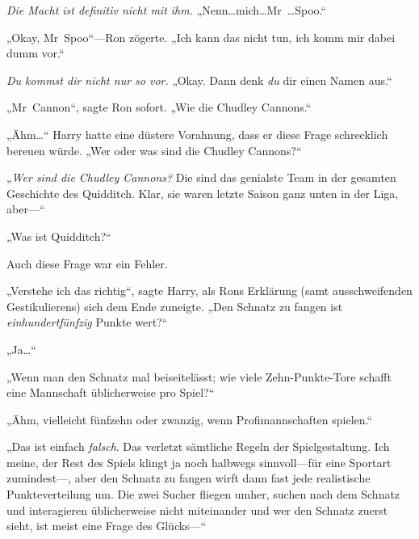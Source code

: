 \emph{Die Macht ist definitiv nicht mit ihm.} „Nenn…mich…Mr~…Spoo.“

„Okay, Mr~Spoo“—Ron zögerte. „Ich kann das nicht tun, ich komm mir dabei dumm vor.“

\emph{Du kommst dir nicht nur so vor.} „Okay. Dann denk \emph{du} dir einen Namen aus.“

„Mr~Cannon“, sagte Ron sofort. „Wie die Chudley Cannons.“

„Ähm…“ Harry hatte eine düstere Vorahnung, dass er diese Frage schrecklich bereuen würde. „Wer oder was sind die Chudley Cannons?“

„\emph{Wer sind die Chudley Cannons?} Die sind das genialste Team in der gesamten Geschichte des Quidditch. Klar, sie waren letzte Saison ganz unten in der Liga, aber—“

„Was ist Quidditch?“

Auch diese Frage war ein Fehler.

„Verstehe ich das richtig“, sagte Harry, als Rons Erklärung (samt ausschweifenden Gestikulierens) sich dem Ende zuneigte. „Den Schnatz zu fangen ist \emph{einhundertfünfzig} Punkte wert?“

„Ja…“

„Wenn man den Schnatz mal beiseitelässt; wie viele Zehn-Punkte-Tore schafft eine Mannschaft üblicherweise pro Spiel?“

„Ähm, vielleicht fünfzehn oder zwanzig, wenn Profimannschaften spielen.“

„Das ist einfach \emph{falsch}. Das verletzt sämtliche Regeln der Spielgestaltung. Ich meine, der Rest des Spiels klingt ja noch halbwegs sinnvoll—für eine Sportart zumindest—, aber den Schnatz zu fangen wirft dann fast jede realistische Punkteverteilung um. Die zwei Sucher fliegen umher, suchen nach dem Schnatz und interagieren üblicherweise nicht miteinander und wer den Schnatz zuerst sieht, ist meist eine Frage des Glücks—“

